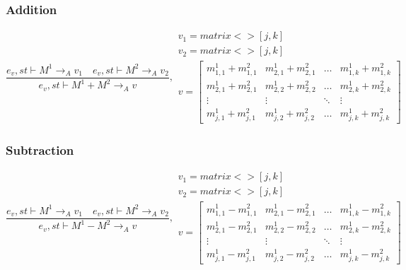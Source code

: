 \subsubsection{Addition}
\begin{equation}
	\frac { { e }_{ v },st\vdash { M }^{ 1 }{ \rightarrow  }_{ A }{ v }_{ 1 }\quad { e }_{ v },st\vdash { M }^{ 2 }{ \rightarrow  }_{ A }{ v }_{ 2 } }{ { e }_{ v },st\vdash { M }^{ 1 }+{ M }^{ 2 }{ \rightarrow  }_{ A }{ v } } ,\begin{matrix} { v }_{ 1 }=matrix<>[j,k] \\ { v }_{ 2 }=matrix<>[j,k] \\ v=\begin{bmatrix} { { m }_{ 1,1 }^{ 1 } } +{ { m }_{ 1,1 }^{ 2 } } & { { m }_{ 2,1 }^{ 1 } } + { { m }_{ 2,1 }^{ 2 } } & \dots  & { m }_{ 1,k }^{ 1 }+{ { m }_{ 1,k }^{ 2} } \\
{ { m }_{ 2,1 }^{ 1 } } + { { m }_{ 2,1 }^{ 2 } } &  { { m }_{ 2,2 }^{ 1 } } +{ { m }_{ 2,2 }^{ 2 } } & \dots & { { m }_{ 2,k }^{ 1 } } + { { m }_{ 2,k }^{ 2 } }
\\ \vdots  & \vdots & \ddots  & \vdots \\
 { m }_{ j,1 }^{ 1 } +{ { m }_{ j,1 }^{ 2 } } & { { m }_{ j,2 }^{ 1 } } +{ { m }_{ j,2 }^{ 2 } }  & \dots & { m }_{ j,k }^{ 1 }+{ { m }_{ j,k }^{ 2 } } \end{bmatrix}

 \end{matrix}
\end{equation}


\subsubsection{Subtraction}
\begin{equation}
	\frac { { e }_{ v },st\vdash { M }^{ 1 }{ \rightarrow  }_{ A }{ v }_{ 1 }\quad { e }_{ v },st\vdash { M }^{ 2 }{ \rightarrow  }_{ A }{ v }_{ 2 } }{ { e }_{ v },st\vdash { M }^{ 1 }-{ M }^{ 2 }{ \rightarrow  }_{ A }{ v } } ,\begin{matrix} { v }_{ 1 }=matrix<>[j,k] \\ { v }_{ 2 }=matrix<>[j,k] \\ v=\begin{bmatrix} { { m }_{ 1,1 }^{ 1 } } - { { m }_{ 1,1 }^{ 2 } } & { { m }_{ 2,1 }^{ 1 } } - { { m }_{ 2,1 }^{ 2 } } & \dots  & { m }_{ 1,k }^{ 1 } - { { m }_{ 1,k }^{ 2} } \\
{ { m }_{ 2,1 }^{ 1 } } - { { m }_{ 2,1 }^{ 2 } } &  { { m }_{ 2,2 }^{ 1 } } - { { m }_{ 2,2 }^{ 2 } } & \dots & { { m }_{ 2,k }^{ 1 } }  - { { m }_{ 2,k }^{ 2 } }
\\ \vdots  & \vdots & \ddots  & \vdots \\
 { m }_{ j,1 }^{ 1 } - { { m }_{ j,1 }^{ 2 } } & { { m }_{ j,2 }^{ 1 } } - { { m }_{ j,2 }^{ 2 } }  & \dots & { m }_{ j,k }^{ 1 } - { { m }_{ j,k }^{ 2 } } \end{bmatrix} \end{matrix}
\end{equation}


